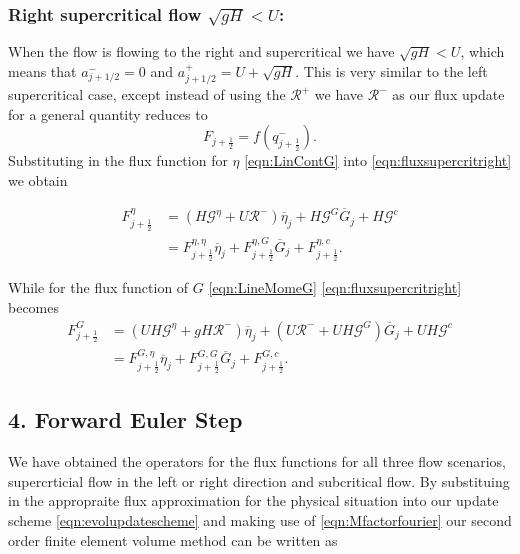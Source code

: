 \subsubsection{Right supercritical flow $\sqrt{gH} < U$:}
When the flow is flowing to the right and supercritical we have $ \sqrt{gH} < U $, which means that $a^-_{j+ 1/2} = 0$ and $a^+_{j+ 1/2} =  U + \sqrt{g H}$. This is very similar to the left supercritical case, except instead of using the $\mathcal{R}^+$ we have $\mathcal{R}^-$ as our flux update for a general quantity reduces to
\begin{equation}
F_{j+\frac{1}{2}} = f\left(q^-_{j+\frac{1}{2}}\right).
\label{eqn:fluxsupercritright}
\end{equation}
Substituting in the flux function for $\eta$ \eqref{eqn:LinContG} into \eqref{eqn:fluxsupercritright} we obtain

\begin{align}
F^\eta_{j+\frac{1}{2}} &= \left(H \mathcal{G}^{\eta} + U \mathcal{R}^- \right)  \overline{\eta}_{j} + H \mathcal{G}^G \overline{G}_{j} + H\mathcal{G}^c \nonumber \\
&= F^{\eta, \eta}_{j+\frac{1}{2}} \overline{\eta}_{j} + F^{\eta, G}_{j+\frac{1}{2}} \overline{G}_{j} + F^{\eta, c}_{j+\frac{1}{2}}.
\label{eqn:Fluxfactorsupercritetaright}
\end{align}

While for the flux function of $G$ \eqref{eqn:LineMomeG}  \eqref{eqn:fluxsupercritright} becomes
\begin{align}
F^G_{j+\frac{1}{2}}  &= \left(UH \mathcal{G}^{\eta} + gH \mathcal{R}^- \right)  \overline{\eta}_{j} + \left(U\mathcal{R}^- +  UH \mathcal{G}^G \right) \overline{G}_{j} + UH\mathcal{G}^c \nonumber \\
&= F^{G, \eta}_{j+\frac{1}{2}} \overline{\eta}_{j} + F^{G, G}_{j+\frac{1}{2}} \overline{G}_{j} + F^{G, c}_{j+\frac{1}{2}}.
\label{eqn:FluxfactorsupercritGright}
\end{align}


\subsection{4. Forward Euler Step}
We have obtained the operators for the flux functions for all three flow scenarios, supercrticial flow in the left or right direction and subcritical flow. By substituing in the appropraite flux approximation for the physical situation into our update scheme \eqref{eqn:evolupdatescheme} and making use of \eqref{eqn:Mfactorfourier} our second order finite element volume method can be written as


